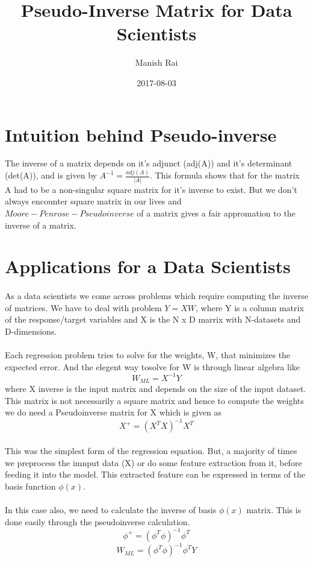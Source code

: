 \documentclass{article} %
\title{Pseudo-Inverse Matrix for Data Scientists}
\author{Manish Rai}
\date{2017-08-03}
\begin{document}
\maketitle%
\newpage %

\section{Intuition behind Pseudo-inverse}

The inverse of a matrix depends on it's adjunct (adj(A)) and it's determinant (det(A)), and is given by $A^{-1} = \frac{adj(A)}{|A|}$. This formula shows that for the matrix A had to be a non-singular square matrix for it's inverse to exist.
But we don't always encounter square matrix in our lives and $Moore-Penrose-Pseudoinverse$ of  a matrix gives a fair appromation to the inverse of a matrix.

\section{Applications for a Data Scientists}
\paragraph{}
As a data scientists we come across problems which require computing the inverse of matrices.
We have to deal with problem $Y = XW$, where Y is a column matrix of the response/target variables and X is the N x D marrix with N-datasets and D-dimensions.
\paragraph{}
Each regression problem tries to solve for the weights, W, that minimizes the expected error. And the elegent way tosolve for W is through linear algebra like
\begin{equation}
W_{ML} = X^{-1}Y
\end{equation}
where X inverse is the input matrix and depends on the size of the input dataset. This matrix is not necessarily a square matrix and hence to compute the weights we do need a Pseudoinverse matrix for X which is given as
\begin{equation}
X^{+} = (X^{T}X)^{-1}X^{T}
\end{equation}
\paragraph{}
This was the simplest form of the regression equation. But, a majority of times we preprocess the imnput data (X) or do some feature extraction from it, before feeding it into the model.
This extracted feature can be expressed in terms of the basis function $\phi(x)$.
\paragraph{}
In this case also, we need to calculate the inverse of basis $\phi(x)$ matrix. This is done easily through the pseudoinverse calculation.
\begin{equation}
\phi^{+} = (\phi^{T}\phi)^{-1}\phi^{T}
\end{equation}
\begin{equation}
W_{ML} = (\phi^{T}\phi)^{-1}\phi^{T} Y
\end{equation}
\end{document}
